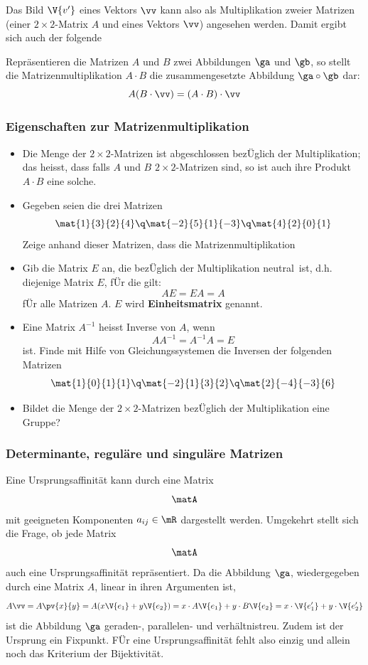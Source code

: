 \documentclass[%
11pt,%
twoside,%
titlepage,%
german,%
headsepline%
]{scrartcl}
\begin{document}
Das Bild $\V{v'}$ eines Vektors $\vv$ kann also als Multiplikation zweier Matrizen (einer $2\times2$-Matrix $A$ und eines Vektors $\vv$) angesehen werden. Damit ergibt sich auch der folgende

\begin{satz}
Repräsentieren die Matrizen $A$ und $B$ zwei Abbildungen $\ga$ und $\gb$, so stellt die
Matrizenmultiplikation $A\cdot B$ die zusammengesetzte Abbildung $\ga\circ\gb$ dar:
$$A(B\cdot\vv)=(A\cdot B)\cdot\vv$$
\end{satz}

\subsubsection{Eigenschaften zur Matrizenmultiplikation}

\begin{itemize}
\item Die Menge der $2\times2$-Matrizen ist abgeschlossen bez\"Uglich der Multiplikation; das heisst, dass falls $A$ und $B$ $2\times2$-Matrizen sind, so ist auch ihre Produkt $A\cdot B$ eine solche.
\item Gegeben seien die drei Matrizen
$$\mat{1}{3}{2}{4}\q\mat{-2}{5}{1}{-3}\q\mat{4}{2}{0}{1}$$
Zeige anhand dieser Matrizen, dass die Matrizenmultiplikation
\item Gib die Matrix $E$ an, die bez\"Uglich der Multiplikation \glqq neutral\grqq\ ist, d.h. diejenige Matrix $E$, f\"Ur die gilt:
$$AE = EA = A$$
f\"Ur alle Matrizen $A$. $E$ wird \textbf{Einheitsmatrix} genannt.
\item Eine Matrix $A^{-1}$ heisst Inverse von $A$, wenn
$$AA^{-1} = A^{-1}A = E$$
ist. Finde mit Hilfe von Gleichungssystemen die Inversen der folgenden Matrizen
$$\mat{1}{0}{1}{1}\q\mat{-2}{1}{3}{2}\q\mat{2}{-4}{-3}{6}$$
\item Bildet die Menge der $2\times2$-Matrizen bez\"Uglich der Multiplikation eine Gruppe?
\end{itemize}

\subsubsection{Determinante, reguläre und singuläre Matrizen}

Eine Ursprungsaffinität kann durch eine Matrix
$$\matA$$
mit geeigneten Komponenten $a_{ij}\in\mR$ dargestellt werden. Umgekehrt stellt sich die Frage, ob jede Matrix
$$\matA$$
auch eine Ursprungsaffinität repräsentiert.
Da die Abbildung $\ga$, wiedergegeben durch eine Matrix $A$, linear in ihren Argumenten ist,
$$
A\vv=A\pv{x}{y}=A(x\V{e_1}+y\V{e_2})=x\cdot A\V{e_1}+y\cdot B\V{e_2}=x\cdot\V{e_1'}+y\cdot\V{e_2'}
$$
ist die Abbildung $\ga$ geraden-, parallelen- und verhältnistreu. Zudem ist der Ursprung ein Fixpunkt. F\"Ur eine Ursprungsaffinität fehlt also einzig und allein noch das Kriterium der Bijektivität.
\end{document}
